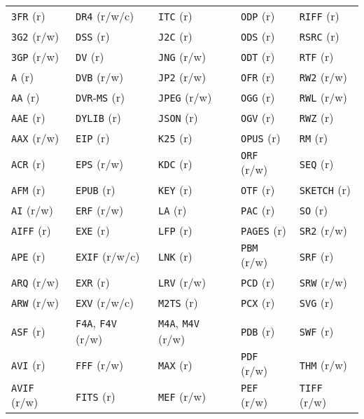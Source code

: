 \documentclass[11pt]{article}
\begin{document}
\begin{table}[htbp]
\centering
\begin{tabular}{|l|l|l|l|l|}
\hline
\texttt{3FR}   (r) & \texttt{DR4}   (r/w/c) & \texttt{ITC}   (r) & \texttt{ODP}   (r) & \texttt{RIFF}  (r)\\
\texttt{3G2}   (r/w) & \texttt{DSS}   (r) & \texttt{J2C}   (r) & \texttt{ODS}   (r) & \texttt{RSRC}  (r)\\
\texttt{3GP}   (r/w) & \texttt{DV}    (r) & \texttt{JNG}   (r/w) & \texttt{ODT}   (r) & \texttt{RTF}   (r)\\
\texttt{A}     (r) & \texttt{DVB}   (r/w) & \texttt{JP2}   (r/w) & \texttt{OFR}   (r) & \texttt{RW2}   (r/w)\\
\texttt{AA}    (r) & \texttt{DVR}-\texttt{MS} (r) & \texttt{JPEG}  (r/w) & \texttt{OGG}   (r) & \texttt{RWL}   (r/w)\\
\texttt{AAE}   (r) & \texttt{DYLIB} (r) & \texttt{JSON}  (r) & \texttt{OGV}   (r) & \texttt{RWZ}   (r)\\
\texttt{AAX}   (r/w) & \texttt{EIP}   (r) & \texttt{K25}   (r) & \texttt{OPUS}  (r) & \texttt{RM}    (r)\\
\texttt{ACR}   (r) & \texttt{EPS}   (r/w) & \texttt{KDC}   (r) & \texttt{ORF}   (r/w) & \texttt{SEQ}   (r)\\
\texttt{AFM}   (r) & \texttt{EPUB}  (r) & \texttt{KEY}   (r) & \texttt{OTF}   (r) & \texttt{SKETCH} (r)\\
\texttt{AI}    (r/w) & \texttt{ERF}   (r/w) & \texttt{LA}    (r) & \texttt{PAC}   (r) & \texttt{SO}    (r)\\
\texttt{AIFF}  (r) & \texttt{EXE}   (r) & \texttt{LFP}   (r) & \texttt{PAGES} (r) & \texttt{SR2}   (r/w)\\
\texttt{APE}   (r) & \texttt{EXIF}  (r/w/c) & \texttt{LNK}   (r) & \texttt{PBM}   (r/w) & \texttt{SRF}   (r)\\
\texttt{ARQ}   (r/w) & \texttt{EXR}   (r) & \texttt{LRV}   (r/w) & \texttt{PCD}   (r) & \texttt{SRW}   (r/w)\\
\texttt{ARW}   (r/w) & \texttt{EXV}   (r/w/c) & \texttt{M2TS}  (r) & \texttt{PCX}   (r) & \texttt{SVG}   (r)\\
\texttt{ASF}   (r) & \texttt{F4A}, \texttt{F4V} (r/w) & \texttt{M4A}, \texttt{M4V} (r/w) & \texttt{PDB}   (r) & \texttt{SWF}   (r)\\
\texttt{AVI}   (r) & \texttt{FFF}   (r/w) & \texttt{MAX}   (r) & \texttt{PDF}   (r/w) & \texttt{THM}   (r/w)\\
\texttt{AVIF}  (r/w) & \texttt{FITS}  (r) & \texttt{MEF}   (r/w) & \texttt{PEF}   (r/w) & \texttt{TIFF}  (r/w)\\

\end{tabular}
\end{table}
\end{document}
